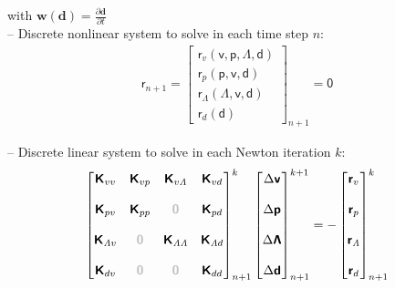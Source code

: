 \documentclass[a4paper,12pt]{report}
\newcommand{\bs}[1]{\boldsymbol{#1}}
\newcommand{\zerom}{\textcolor{lightgray}{\bs{\mathsf{0}}}}
\newcommand{\ROP}{\bs{\mathsf{r}}}
\newcommand{\LMZ}{\bs{\mathsf{\Lambda}}}
\newcommand{\lmzi}{\mathit{\Lambda}} %
\begin{document}
with $\boldsymbol{w}(\boldsymbol{d})=\frac{\partial\boldsymbol{d}}{\partial t}$\\

-- Discrete nonlinear system to solve in each time step $n$:
\begin{equation}
\label{equation-nonlin-sys-fluid-ale-0d}
\begin{aligned}
\ROP_{n+1} = \begin{bmatrix} \ROP_{v}(\boldsymbol{\mathsf{v}},\boldsymbol{\mathsf{p}},\LMZ,\boldsymbol{\mathsf{d}}) \\ \ROP_{p}(\boldsymbol{\mathsf{p}},\boldsymbol{\mathsf{v}},\boldsymbol{\mathsf{d}}) \\ \ROP_{\mathit{\Lambda}}(\LMZ,\boldsymbol{\mathsf{v}},\boldsymbol{\mathsf{d}}) \\ \ROP_{d}(\boldsymbol{\mathsf{d}}) \end{bmatrix}_{n+1} = \boldsymbol{\mathsf{0}}
\end{aligned}
\end{equation}

-- Discrete linear system to solve in each Newton iteration $k$:
\begin{equation}
\label{equation-lin-sys-fluid-ale-0d}
\begin{aligned}
\begin{bmatrix} \boldsymbol{\mathsf{K}}_{vv} & \boldsymbol{\mathsf{K}}_{vp} & \boldsymbol{\mathsf{K}}_{v\lmzi} & \boldsymbol{\mathsf{K}}_{vd} \\ \\ \boldsymbol{\mathsf{K}}_{pv} & \boldsymbol{\mathsf{K}}_{pp} & \zerom & \boldsymbol{\mathsf{K}}_{pd} \\ \\ \boldsymbol{\mathsf{K}}_{\lmzi v} & \zerom & \boldsymbol{\mathsf{K}}_{\lmzi \lmzi} & \boldsymbol{\mathsf{K}}_{\lmzi d} \\ \\ \boldsymbol{\mathsf{K}}_{dv}  & \zerom & \zerom & \boldsymbol{\mathsf{K}}_{dd} \end{bmatrix}_{n+1}^{k}\begin{bmatrix} \Delta\boldsymbol{\mathsf{v}} \\ \\ \Delta\boldsymbol{\mathsf{p}} \\ \\ \Delta\LMZ \\ \\ \Delta\boldsymbol{\mathsf{d}} \end{bmatrix}_{n+1}^{k+1}=-\begin{bmatrix} \ROP_{v} \\ \\ \ROP_{p} \\ \\ \ROP_{\lmzi} \\ \\ \ROP_{d}\end{bmatrix}_{n+1}^{k}
\end{aligned}
\end{equation}
\end{document}

